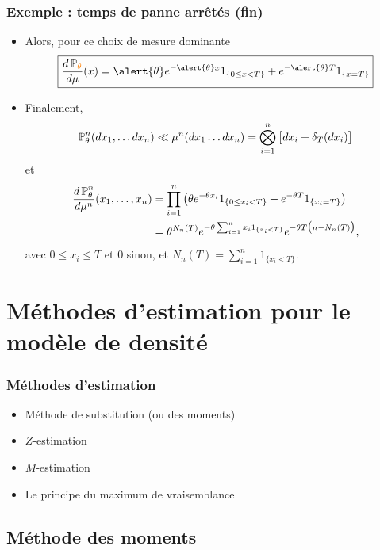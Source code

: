 \begin{frame}
\frametitle{Exemple : temps de panne \og arrêtés\fg{} (fin)}
\begin{itemize}
\item Alors, pour ce choix de mesure dominante
$$\boxed{\frac{d\PP_{\tco{\theta}}}{d\mu}(x) = \alert{\theta} e^{-\alert{\theta} x} 1_{\{0 \leq x < T\}} +  e^{-\alert{\theta} T}1_{\{x=T\}}}$$
\item Finalement,
$$\operatorname{{\mathbb P}}_\theta^n(dx_1,\ldots dx_n)
\ll \mu^n(dx_1 \ldots dx_n) = \bigotimes_{i = 1}^n \big[dx_i +
\delta_{T}(dx_i)\big]
$$
et
\begin{align*}
\frac{d\operatorname{{\mathbb P}}_\theta^n}{d\mu^n}(x_1,\ldots, x_n) & = \prod_{i = 1}^n \big(\theta e^{-\theta x_i} 1_{\{0 \leq x_i < T\}} +  e^{-\theta T}1_{\{x_i=T\}}\big) \\
& = \theta^{N_n(T)} e^{-\theta \sum_{i = 1}^{n}x_i 1_{\{x_i<T\}}}e^{-\theta T\big(n-N_n(T)\big)},
\end{align*}
\alert{ avec $0 \leq x_i \leq T$} et $0$ sinon, et  $N_n(T) = \sum_{i = 1}^n1_{\{x_i < T\}}$.
\end{itemize}
\end{frame}




\section{Méthodes d'estimation pour le modèle de densité}


\begin{frame}
\frametitle{Méthodes d'estimation }
\begin{itemize}
\item Méthode de substitution (ou des moments)
\item $Z$-estimation
\item $M$-estimation
\item Le principe du \alert{ maximum de vraisemblance}
\end{itemize}
\end{frame}


\subsection{Méthode des moments}

